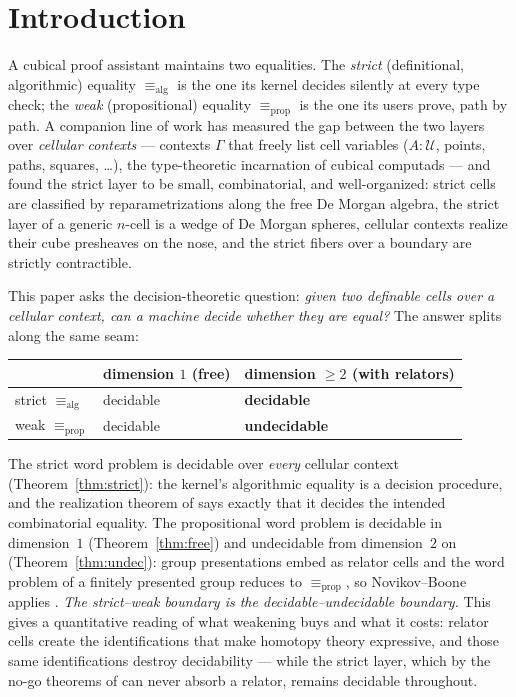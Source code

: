 \documentclass[11pt]{amsart}
\theoremstyle{definition}
\newcommand{\aconv}{\equiv_{\mathrm{alg}}}
\newcommand{\propeq}{\equiv_{\mathrm{prop}}}
\newcommand{\U}{\mathcal{U}}
\begin{document}
\section{Introduction}
\label{sec:intro}

A cubical proof assistant maintains two equalities.  The
\emph{strict} (definitional, algorithmic) equality $\aconv$ is the
one its kernel decides silently at every type check; the \emph{weak}
(propositional) equality $\propeq$ is the one its users prove, path
by path.  A companion line of work
\cite{Const,Sphere,Realization,Convexity} has measured the gap
between the two layers over \emph{cellular contexts} --- contexts
$\Gamma$ that freely list cell variables ($A : \U$, points, paths,
squares, \dots), the type-theoretic incarnation of cubical computads
--- and found the strict layer to be small, combinatorial, and
well-organized: strict cells are classified by reparametrizations
along the free De Morgan algebra, the strict layer of a generic
$n$-cell is a wedge of De Morgan spheres, cellular contexts realize
their cube presheaves on the nose, and the strict fibers over a
boundary are strictly contractible.

This paper asks the decision-theoretic question: \emph{given two
definable cells over a cellular context, can a machine decide whether
they are equal?}  The answer splits along the same seam:

\begin{center}
\begin{tabular}{l|l|l}
  & dimension $1$ (free) & dimension $\geq 2$ (with relators)\\
  \hline
  strict $\aconv$ & decidable & \textbf{decidable}\\
  weak $\propeq$ & decidable & \textbf{undecidable}
\end{tabular}
\end{center}

\noindent The strict word problem is decidable over \emph{every}
cellular context (Theorem~\ref{thm:strict}): the kernel's
algorithmic equality is a decision procedure, and the realization
theorem of \cite{Realization} says exactly that it decides the
intended combinatorial equality.  The propositional word problem is
decidable in dimension~$1$ (Theorem~\ref{thm:free}) and undecidable
from dimension~$2$ on (Theorem~\ref{thm:undec}): group presentations
embed as relator cells and the word problem of a finitely presented
group reduces to $\propeq$, so Novikov--Boone applies
\cite{Novikov,Boone}.  \emph{The strict--weak boundary is the
decidable--undecidable boundary.}  This gives a quantitative reading
of what weakening buys and what it costs: relator cells create the
identifications that make homotopy theory expressive, and those same
identifications destroy decidability --- while the strict layer,
which by the no-go theorems of \cite{Const,Convexity} can never
absorb a relator, remains decidable throughout.
\end{document}
